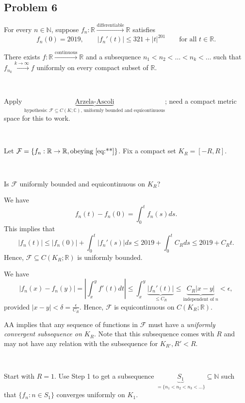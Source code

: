 \documentclass[letterpaper, reqno,11pt]{article}
\newcommand{\RR}{\mathbb{R}}
\newcommand{\CC}{\mathbb{C}}
\newcommand{\NN}{\mathbb{N}}
\begin{document}
\subsection{Problem 6}

For every $n \in \NN$, suppose $f_n : \RR \xrightarrow{\text{differentiable}} \RR$ satisfies
\begin{equation} \label{eq:**} \tag{**}
  f_n(0) = 2019, \qquad \left|f_n'(t)\right| \leq 321 + |t|^{201} \qquad \text{for all $t \in \RR$}.
\end{equation}

 There exists $f : \RR \xrightarrow{\text{continuous}} \RR$ and a subsequence $n_1 < n_2 < \ldots < n_k < \ldots$ such that $f_{n_k} \xrightarrow{k \to \infty} f$ uniformly on every compact subset of $\RR$.

~

 Apply $\underbrace{\text{Arzela-Ascoli}}_\text{hypothesis: $\mathcal F \subseteq C(K; \CC)$, uniformly bounded and equicontinuous}$; need a compact metric space for this to work.

~

\noindent Let $\mathcal F = \{ f_n : \RR \to \RR, \text{obeying \eqref{eq:**}} \}$. Fix a compact set $K_R = [-R, R]$.

~

 Is $\mathcal F$ uniformly bounded and equicontinuous on $K_R$?

We have
$$ f_n(t) - f_n(0) = \int_0^t f_n(s) ds. $$
This implies that
$$ |f_n(t)| \leq |f_n(0)| + \int_0^t \left|f_n'(s)\right| ds \leq 2019 + \int_0^t C_R ds \leq 2019 + C_R t. $$
Hence, $\mathcal F \subseteq C(K_R; \RR)$ is uniformly bounded.

We have
$$ |f_n(x) - f_n(y)|= \left|\int_x^y f'(t) dt\right| \leq \int_x^y \underbrace{\left|f_n'(t)\right|}_{\leq C_R} \leq \underbrace{C_R |x - y|}_\text{independent of $n$} < \epsilon, $$
provided $|x - y| < \delta = \frac{\epsilon}{C_R}$. Hence, $\mathcal F$ is equicontinuous on $C(K_R; \RR)$.

AA implies that any sequence of functions in $\mathcal F$ must have a \emph{uniformly convergent subsequence on $K_R$}. Note that this subsequence comes with $R$ and may not have any relation with the subsequence for $K_{R'}, R' < R$.

~

 Start with $R = 1$. Use Step 1 to get a subsequence $\underbrace{S_1}_{= \{ n_1 < n_2 < n_3 < \ldots \}} \subseteq \NN$ such that $\{ f_n : n \in S_1 \}$ converges uniformly on $K_1$.
\end{document}
